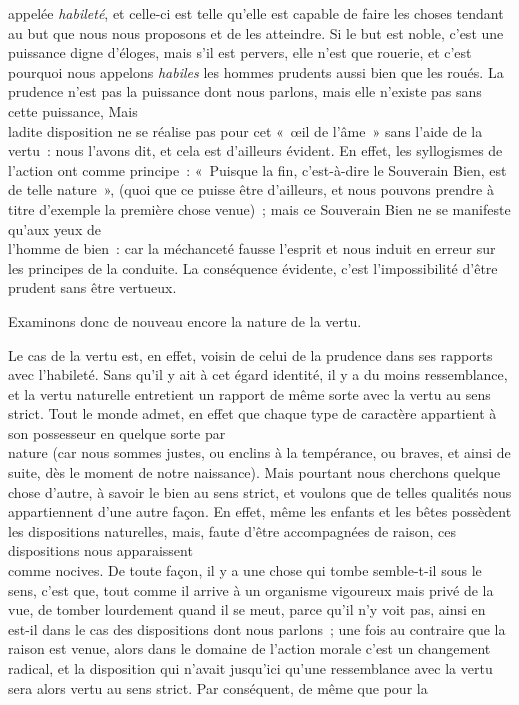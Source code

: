 \documentclass[french,twoside]{book} %
\begin{document}
appelée {\itshape habileté}, et celle-ci est telle qu’elle est capable de faire les choses tendant au but que nous nous proposons et de les atteindre. Si le but est noble, c’est une puissance digne d’éloges, mais s’il est pervers, elle n’est que rouerie, et c’est pourquoi nous appelons {\itshape habiles} les hommes prudents aussi bien que les roués. La prudence n’est pas la puissance dont nous parlons, mais elle n’existe pas sans cette puissance, Mais \\
ladite disposition ne se réalise pas pour cet « œil de l’âme » sans l’aide de la vertu : nous l’avons dit, et cela est d’ailleurs évident. En effet, les syllogismes de l’action ont comme principe : « Puisque la fin, c’est-à-dire le Souverain Bien, est de telle nature », (quoi que ce puisse être d’ailleurs, et nous pouvons prendre à titre d’exemple la première chose venue) ; mais ce Souverain Bien ne se manifeste qu’aux yeux de \\
l’homme de bien : car la méchanceté fausse l’esprit et nous induit en erreur sur les principes de la conduite. La conséquence évidente, c’est l’impossibilité d’être prudent sans être vertueux.\par
 Examinons donc de nouveau encore la nature de la vertu.\par
Le cas de la vertu est, en effet, voisin de celui de la prudence dans ses rapports avec l’habileté. Sans qu’il y ait à cet égard identité, il y a du moins ressemblance, et la vertu naturelle entretient un rapport de même sorte avec la vertu au sens strict. Tout le monde admet, en effet que chaque type de caractère appartient à son possesseur en quelque sorte par \\
nature (car nous sommes justes, ou enclins à la tempérance, ou braves, et ainsi de suite, dès le moment de notre naissance). Mais pourtant nous cherchons quelque chose d’autre, à savoir le bien au sens strict, et voulons que de telles qualités nous appartiennent d’une autre façon. En effet, même les enfants et les bêtes possèdent les dispositions naturelles, mais, faute d’être accompagnées de raison, ces dispositions nous apparaissent \\
comme nocives. De toute façon, il y a une chose qui tombe semble-t-il sous le sens, c’est que, tout comme il arrive à un organisme vigoureux mais privé de la vue, de tomber lourdement quand il se meut, parce qu’il n’y voit pas, ainsi en est-il dans le cas des dispositions dont nous parlons ; une fois au contraire que la raison est venue, alors dans le domaine de l’action morale c’est un changement radical, et la disposition qui n’avait jusqu’ici qu’une ressemblance avec la vertu sera alors vertu au sens strict. Par conséquent, de même que pour la \\
\end{document}
